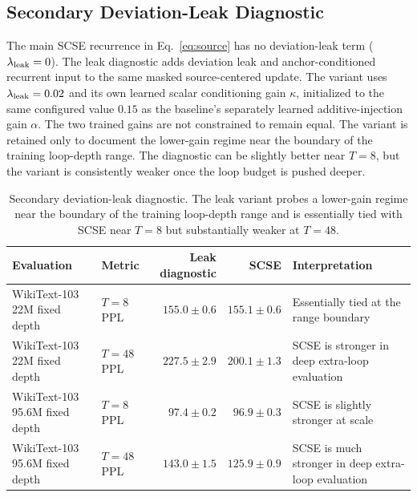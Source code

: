 \documentclass[letterpaper]{article} %
\newcommand{\SCSE}{\textsc{SCSE}}
\theoremstyle{remark}
\begin{document}
\subsection{Secondary Deviation-Leak Diagnostic}
\label{app:secondary-condleak}
The main \SCSE{} recurrence in Eq.~\ref{eq:source} has no deviation-leak term ($\lambda_{\rm leak}=0$).  The leak diagnostic adds deviation leak and anchor-conditioned recurrent input to the same masked source-centered update.  The variant uses $\lambda_{\rm leak}=0.02$ and its own learned scalar conditioning gain $\kappa$, initialized to the same configured value $0.15$ as the baseline's separately learned additive-injection gain $\alpha$.  The two trained gains are not constrained to remain equal.  The variant is retained only to document the lower-gain regime near the boundary of the training loop-depth range.  The diagnostic can be slightly better near $T=8$, but the variant is consistently weaker once the loop budget is pushed deeper.

\begin{table}[t!]
	\centering
	\scriptsize
	\begin{tabular}{llrrl}
		\toprule
		Evaluation                     & Metric     & Leak diagnostic        & \SCSE{}                & Interpretation                                         \\
		\midrule
		WikiText-103 22M fixed depth   & $T=8$ PPL  & $\mathbf{155.0\pm0.6}$ & $155.1\pm0.6$          & Essentially tied at the range boundary                 \\
		WikiText-103 22M fixed depth   & $T=48$ PPL & $227.5\pm2.9$          & $\mathbf{200.1\pm1.3}$ & \SCSE{} is stronger in deep extra-loop evaluation      \\
		WikiText-103 95.6M fixed depth & $T=8$ PPL  & $97.4\pm0.2$           & $\mathbf{96.9\pm0.3}$  & \SCSE{} is slightly stronger at scale                  \\
		WikiText-103 95.6M fixed depth & $T=48$ PPL & $143.0\pm1.5$          & $\mathbf{125.9\pm0.9}$ & \SCSE{} is much stronger in deep extra-loop evaluation \\
		\bottomrule
	\end{tabular}
	\caption{Secondary deviation-leak diagnostic.  The leak variant probes a lower-gain regime near the boundary of the training loop-depth range and is essentially tied with \SCSE{} near $T=8$ but substantially weaker at $T=48$.}
	\label{tab:secondary_condleak}
\end{table}
\end{document}

